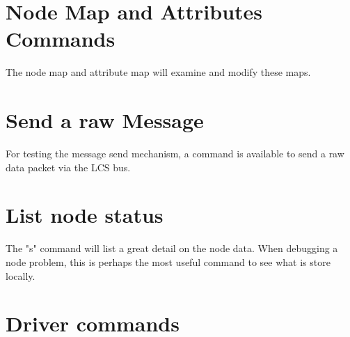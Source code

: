
\section{Node Map and Attributes Commands}

The node map and attribute map will examine and modify these maps.


\section{Send a raw Message}

For testing the message send mechanism, a command is available to send a raw data packet via the LCS bus.


\section{List node status}

The "s" command will list a great detail on the node data. When debugging a node problem, this is perhaps the most useful command to see what is store locally.


\section{Driver commands}



